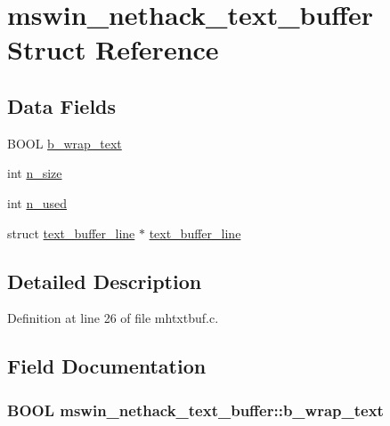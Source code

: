 \hypertarget{structmswin__nethack__text__buffer}{\section{mswin\+\_\+nethack\+\_\+text\+\_\+buffer Struct Reference}
\label{structmswin__nethack__text__buffer}
}
\subsection*{Data Fields}
\begin{DoxyCompactItemize}
\item 
B\+O\+O\+L \hyperlink{structmswin__nethack__text__buffer_a78db27a26e3871f7309475ad133da130}{b\+\_\+wrap\+\_\+text}
\item 
int \hyperlink{structmswin__nethack__text__buffer_a68d3b91e928c9eda9cad2cbae937de64}{n\+\_\+size}
\item 
int \hyperlink{structmswin__nethack__text__buffer_a415404171adf88a11b4e5cba4dc55710}{n\+\_\+used}
\item 
struct \hyperlink{structtext__buffer__line}{text\+\_\+buffer\+\_\+line} $\ast$ \hyperlink{structmswin__nethack__text__buffer_a50aafb5cf8dde4a5a2e86bd1247d7736}{text\+\_\+buffer\+\_\+line}
\end{DoxyCompactItemize}


\subsection{Detailed Description}


Definition at line 26 of file mhtxtbuf.\+c.



\subsection{Field Documentation}
\hypertarget{structmswin__nethack__text__buffer_a78db27a26e3871f7309475ad133da130}{
\subsubsection[{b\+\_\+wrap\+\_\+text}]{\setlength{\rightskip}{0pt plus 5cm}B\+O\+O\+L mswin\+\_\+nethack\+\_\+text\+\_\+buffer\+::b\+\_\+wrap\+\_\+text}}\label{structmswin__nethack__text__buffer_a78db27a26e3871f7309475ad133da130}


